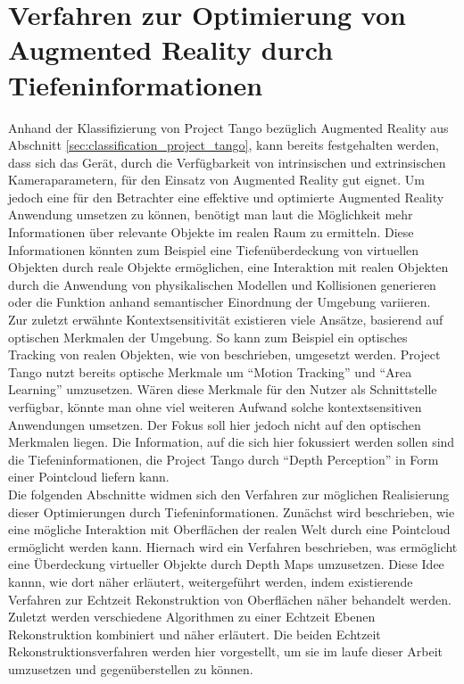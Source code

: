 \chapter{Verfahren zur Optimierung von Augmented Reality durch Tiefeninformationen}

Anhand der Klassifizierung von Project Tango bezüglich Augmented Reality aus Abschnitt \ref{sec:classification_project_tango}, kann bereits festgehalten werden, dass sich das Gerät, durch die Verfügbarkeit von intrinsischen und extrinsischen Kameraparametern, für den Einsatz von Augmented Reality gut eignet. Um jedoch eine für den Betrachter eine effektive und optimierte Augmented Reality Anwendung umsetzen zu können, benötigt man laut \citet{azuma2001recent} die Möglichkeit mehr Informationen über relevante Objekte im realen Raum zu ermitteln. Diese Informationen könnten zum Beispiel eine Tiefenüberdeckung von virtuellen Objekten durch reale Objekte ermöglichen, eine Interaktion mit realen Objekten durch die Anwendung von physikalischen Modellen und Kollisionen generieren oder die Funktion anhand semantischer Einordnung der Umgebung variieren. \\

Zur zuletzt erwähnte Kontextsensitivität existieren viele Ansätze, basierend auf optischen Merkmalen der Umgebung. So kann zum Beispiel ein optisches Tracking von realen Objekten, wie von \citet{lee2008hybrid} beschrieben, umgesetzt werden. Project Tango nutzt bereits optische Merkmale um \enquote{Motion Tracking} und \enquote{Area Learning} umzusetzen. Wären diese Merkmale für den Nutzer als Schnittstelle verfügbar, könnte man ohne viel weiteren Aufwand solche kontextsensitiven Anwendungen umsetzen. Der Fokus soll hier jedoch nicht auf den optischen Merkmalen liegen. Die Information, auf die sich hier fokussiert werden sollen sind die Tiefeninformationen, die Project Tango durch \enquote{Depth Perception} in Form einer Pointcloud liefern kann.\\

Die folgenden Abschnitte widmen sich den Verfahren zur möglichen Realisierung dieser Optimierungen durch Tiefeninformationen. Zunächst wird beschrieben, wie eine mögliche Interaktion mit Oberflächen der realen Welt durch eine Pointcloud ermöglicht werden kann. Hiernach wird ein Verfahren beschrieben, was ermöglicht eine Überdeckung virtueller Objekte durch Depth Maps umzusetzen. Diese Idee kannn, wie dort näher erläutert, weitergeführt werden, indem existierende Verfahren zur Echtzeit Rekonstruktion von Oberflächen näher behandelt werden. Zuletzt werden verschiedene Algorithmen zu einer Echtzeit Ebenen Rekonstruktion kombiniert und näher erläutert. Die beiden Echtzeit Rekonstruktionsverfahren werden hier vorgestellt, um sie im laufe dieser Arbeit umzusetzen und gegenüberstellen zu können.\\








